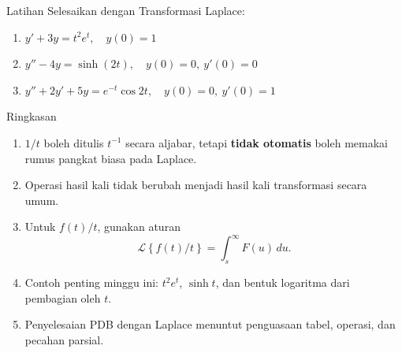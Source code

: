 \documentclass[aspectratio=169,10pt]{beamer}
\newcommand{\Lcal}{\mathcal{L}}
\newcommand{\Lap}[1]{\Lcal\left\{#1\right\}}
\begin{document}
\begin{frame}{Latihan}
Selesaikan dengan Transformasi Laplace:
\begin{enumerate}
\item $y'+3y=t^2e^t,\quad y(0)=1$
\item $y''-4y=\sinh(2t),\quad y(0)=0,\ y'(0)=0$
\item $y''+2y'+5y=e^{-t}\cos 2t,\quad y(0)=0,\ y'(0)=1$
\end{enumerate}
\end{frame}

\begin{frame}{Ringkasan}
\begin{enumerate}
\item $1/t$ boleh ditulis $t^{-1}$ secara aljabar, tetapi \textbf{tidak otomatis} boleh memakai rumus pangkat biasa pada Laplace.
\item Operasi hasil kali tidak berubah menjadi hasil kali transformasi secara umum.
\item Untuk $f(t)/t$, gunakan aturan
\[
\Lap{f(t)/t}=\int_s^{\infty}F(u)\,du.
\]
\item Contoh penting minggu ini: $t^2e^t$, $\sinh t$, dan bentuk logaritma dari pembagian oleh $t$.
\item Penyelesaian PDB dengan Laplace menuntut penguasaan tabel, operasi, dan pecahan parsial.
\end{enumerate}
\end{frame}
\end{document}
